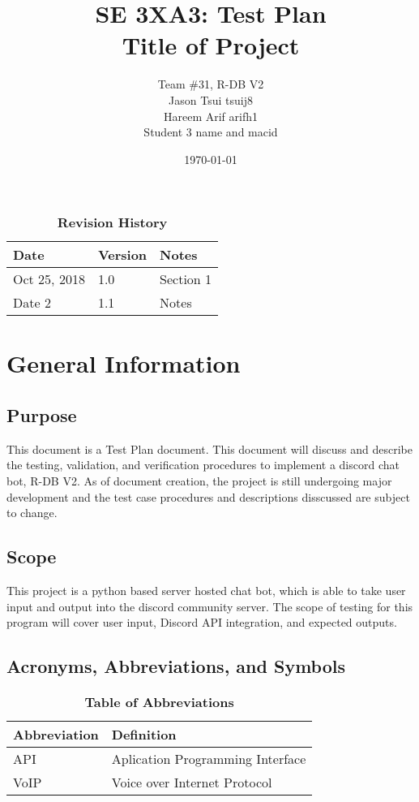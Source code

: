 \documentclass[12pt, titlepage]{article}
\title{SE 3XA3: Test Plan\\Title of Project}
\author{Team \#31, R-DB V2
		\\ Jason Tsui tsuij8
		\\ Hareem Arif arifh1
		\\ Student 3 name and macid
}
\date{\today}
\begin{document}
\maketitle

\tableofcontents
\listoftables
\listoffigures

\begin{table}[bp]
\caption{\bf Revision History}
\begin{tabularx}{\textwidth}{p{3cm}p{2cm}X}
\toprule {\bf Date} & {\bf Version} & {\bf Notes}\\
\midrule
Oct 25, 2018 & 1.0 & Section 1\\
Date 2 & 1.1 & Notes\\
\bottomrule
\end{tabularx}
\end{table}

\newpage


\section{General Information}

\subsection{Purpose}
This document is a Test Plan document. This document will discuss and describe the testing, validation, and verification procedures to implement a discord chat bot, R-DB V2. As of document creation, the project is still undergoing major development and the test case procedures and descriptions disscussed are subject to change.

\subsection{Scope}
This project is a python based server hosted chat bot, which is able to take user input and output into the discord community server. The scope of testing for this program will cover user input, Discord API integration, and expected outputs. 

\subsection{Acronyms, Abbreviations, and Symbols}
	
\begin{table}[hbp]
\caption{\textbf{Table of Abbreviations}} \label{Table}

\begin{tabularx}{\textwidth}{p{3cm}X}
\toprule
\textbf{Abbreviation} & \textbf{Definition} \\
\midrule
API & Aplication Programming Interface\\
VoIP & Voice over Internet Protocol\\
\bottomrule
\end{tabularx}

\end{table}
\end{document}
